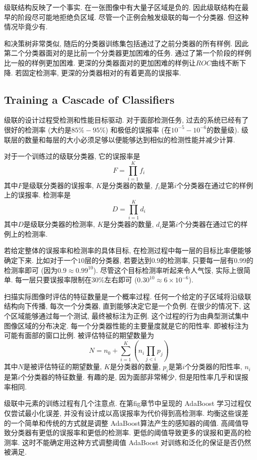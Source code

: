 \documentclass[utf8]{ctexart}
\begin{document}
级联结构反映了一个事实. 在一张图像中有大量子区域是负的. 因此级联结构在最早的阶段尽可能地拒绝负区域. 尽管一个正例会触发级联的每一个分类器. 但这种情况毕竟少有.

和决策树非常类似, 随后的分类器训练集包括通过了之前分类器的所有样例. 因此第二个分类器面对的是比前一个分类器更加困难的任务. 通过了第一个阶段的样例比一般的样例更加困难. 更深的分类器面对的更加困难的样例让$ROC$曲线不断下降. 若固定检测率, 更深的分类器相对的有着更高的误报率.

\subsection{Training a Cascade of Classifiers}
级联的设计过程受检测和性能目标驱动. 对于面部检测任务, 过去的系统已经有了很好的检测率 (大约是$85\%-95\%$) 和极低的误报率 (在$10^{-5}-10^{-6}$的数量级). 级联层的数量和每层的大小必须足够以便能够达到相似的检测性能并减少计算.

对于一个训练过的级联分类器, 它的误报率是
\[
F=\prod_{i=1}^{K}f_i
\]
其中$F$是级联分类器的误报率, $K$是分类器的数量, $f_i$是第$i$个分类器在通过它的样例上的误报率. 检测率是
\[
    D=\prod_{i=1}^{K}d_i
\]
其中$D$是级联分类器的检测率, $K$是分类器的数量, $d_i$是第$i$个分类器在通过它的样例上的检测率.

若给定整体的误报率和检测率的具体目标, 在检测过程中每一层的目标比率便能够确定下来. 比如对于一个$10$层的分类器, 若要达到$0.9$的检测率, 只要每一层有$0.99$的检测率即可 (因为$0.9\approx0.99^{10}$). 尽管这个目标检测率听起来令人气馁, 实际上很简单. 每一层只要误报率限制在$30\%$左右即可 ($0.30^{10}\approx6\times10^{-6}$).

扫描实际图像时评估的特征数量是一个概率过程. 任何一个给定的子区域将沿级联结构向下传播, 每次一个分类器, 直到能够决定它是一个负例. 在很少的情况下, 这个区域能够通过每一个测试, 最终被标注为正例. 这个过程的行为由典型测试集中图像区域的分布决定. 每一个分类器性能的主要量度就是它的阳性率. 即被标注为可能有面部的窗口比例. 被评估特征的期望数量为
\[
N=n_0+\sum_{i=1}^{K}\left(n_i\prod_{j<i}p_j\right)
\]
其中$N$是被评估特征的期望数量, $K$是分类器的数量, $p_i$是第$i$个分类器的阳性率, $n_i$是第$i$个分类器的特征数量. 有趣的是, 因为面部非常稀少, 但是阳性率几乎和误报率相同.

级联中元素的训练过程有几个注意点. 在第fig章节中呈现的 AdaBoost 学习过程仅仅尝试最小化误差, 并没有设计成以高误报率为代价得到高检测率. 均衡这些误差的一个简单和传统的方式就是调整 AdaBoost算法产生的感知器的阈值. 高阈值导致分类器有更低的误报率和更低的检测率. 更低的阈值导致更多的误报和更高的检测率. 这时不能确定用这种方式调整阈值 AdaBoost 对训练和泛化的保证是否仍然被满足.
\end{document}
